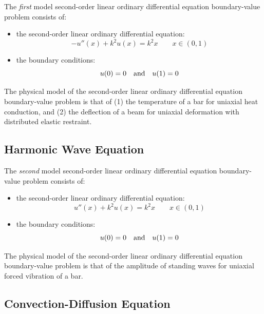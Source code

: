 \documentclass[10pt]{article}		%
\numberwithin{equation}{section}
\begin{document}
The \textit{first} model second-order linear ordinary differential equation boundary-value problem consists of:
\begin{itemize}
	\item the second-order linear ordinary differential equation:
	\begin{equation}
	-u''(x)+k^2u(x)=k^2x \qquad x \in (0, 1)
	\end{equation}
	\item the boundary conditions:
	\begin{equation}
	u(0) = 0 \quad \textnormal{and} \quad u(1) = 0 
	\end{equation}
\end{itemize}
The physical model of the second-order linear ordinary differential equation boundary-value problem is that of (1) the temperature of a bar for uniaxial heat conduction, and (2) the deflection of a beam for uniaxial deformation with distributed elastic restraint.


\subsection{Harmonic Wave Equation}

The \textit{second} model second-order linear ordinary differential equation boundary-value problem consists of:
\begin{itemize}
	\item the second-order linear ordinary differential equation:
	\begin{equation}
	u''(x)+k^2u(x)=k^2x \qquad x \in (0, 1)
	\end{equation}
	\item the boundary conditions:
	\begin{equation}
	u(0) = 0 \quad \textnormal{and} \quad u(1) = 0 
	\end{equation}
\end{itemize}
The physical model of the second-order linear ordinary differential equation boundary-value problem is that of the amplitude of standing waves for uniaxial forced vibration of a bar.

\subsection{Convection-Diffusion Equation}
\end{document}

